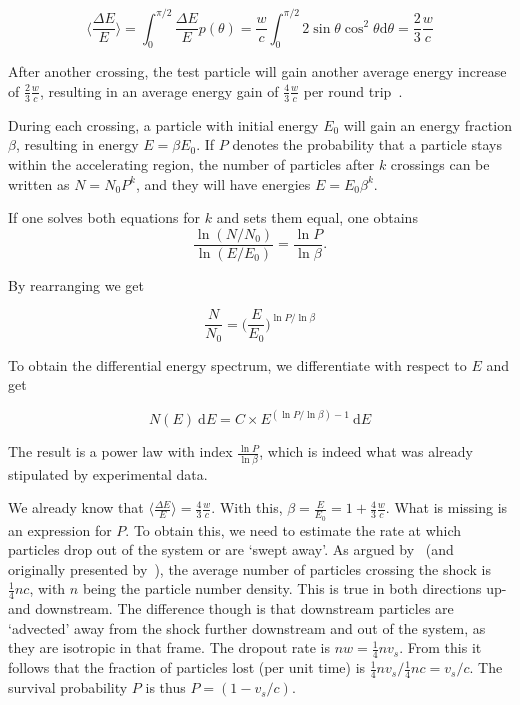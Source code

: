 \begin{equation}
    \bigg\langle \frac{\Delta E}{E} \bigg\rangle = \int_0^{\pi/2} \frac{\Delta E}{E} p(\theta) = \frac{w}{c} \int_0^{\pi/2} 2 \sin{\theta} \cos^2{\theta}  \text{d}\theta = \frac{2}{3}\frac{w}{c}
\end{equation}

After another crossing, the test particle will gain another average energy increase of $\frac{2}{3}\frac{w}{c}$, resulting in an average energy gain of $\frac{4}{3}\frac{w}{c}$ per round trip~\cite{Longair2011}.

During each crossing, a particle with initial energy $E_0$ will gain an energy fraction $\beta$, resulting in energy $E=\beta E_0$. If $P$ denotes the probability that a particle stays within the accelerating region, the number of particles after $k$ crossings can be written as $N=N_0 P^k $, and they will have energies $E=E_0\beta^k$.

If one solves both equations for $k$ and sets them equal, one obtains
\begin{equation}
    \frac{\ln (N/N_0)}{\ln (E/E_0)} = \frac{\ln P}{\ln \beta}.
\end{equation}

By rearranging we get

\begin{equation}
    \frac{N}{N_0} = \bigg(\frac{E}{E_0}\bigg)^{\ln P / \ln \beta}
\end{equation}

To obtain the differential energy spectrum, we differentiate with respect to $E$ and get

\begin{equation}
    \label{eqn:diff_e_spec}
    N(E)~\text{d} E = C\times E^{(\ln P/\ln\beta)-1}~\text{d} E
\end{equation}

The result is a power law with index $\frac{\ln P}{\ln \beta}$, which is indeed what was already stipulated by experimental data.

We already know that $\big\langle\frac{\Delta E}{E}\big\rangle = \frac{4}{3}\frac{w}{c}$. With this, $\beta = \frac{E}{E_0} = 1 + \frac{4}{3}\frac{w}{c}$. What is missing is an expression for $P$. To obtain this, we need to estimate the rate at which particles drop out of the system or are `swept away'. As argued by~\cite{Longair2011} (and originally presented by~), the average number of particles crossing the shock is $\frac{1}{4} n c$, with $n$ being the particle number density. This is true in both directions up- and downstream. The difference though is that downstream particles are `advected' away from the shock further downstream and out of the system, as they are isotropic in that frame. The dropout rate is $n w=\frac{1}{4}nv_s$. From this it follows that the fraction of particles lost (per unit time) is $\frac{1}{4} n v_s/\frac{1}{4}nc = v_s/c$. The survival probability $P$ is thus $P=(1-v_s/c)$.

